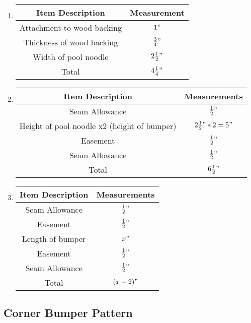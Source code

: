 \documentclass[
10pt, %
a4paper, %
oneside, %
headinclude,footinclude, %
BCOR5mm, %
]{scrartcl}
\begin{document}
\begin{enumerate}[label=\Alph*]
	\item %
	\begin{tabular}{|c|c|}
		\hline
		Item Description & Measurement \\ \hline
		Attachment to wood backing & $1"$ \\ \hline
		Thickness of wood backing & $\frac{3}{4}"$ \\ \hline
		Width of pool noodle & $2\frac{1}{2}"$ \\ \hline
		Total & $4\frac{1}{4}"$ \\ \hline
	\end{tabular}
	
	\item %
	\begin{tabular}{|c|c|}
		\hline
		Item Description & Measurements \\ \hline
		Seam Allowance & $\frac{1}{2}"$ \\ \hline
		Height of pool noodle x2 (height of bumper) & $2\frac{1}{2}" * 2 = 5"$ \\ \hline
		Easement & $\frac{1}{2}"$ \\ \hline
		Seam Allowance & $\frac{1}{2}"$ \\ \hline
		Total & $6\frac{1}{2}"$\\ \hline
	\end{tabular}
	
	\item %
	\begin{tabular}{|c|c|}
		\hline
		Item Description & Measurements \\ \hline
		Seam Allowance & $\frac{1}{2}"$ \\ \hline
		Easement & $\frac{1}{2}"$ \\ \hline
		Length of bumper & $x"$ \\ \hline
		Easement & $\frac{1}{2}"$ \\ \hline
		Seam Allowance & $\frac{1}{2}"$ \\ \hline
		Total & $(x + 2)"$ \\ \hline
	\end{tabular}

\end{enumerate}

\FloatBarrier

\subsection{Corner Bumper Pattern}
\end{document}
